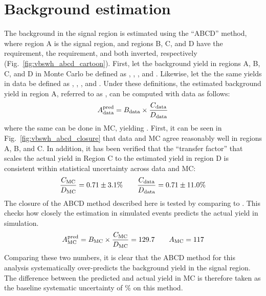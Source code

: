 \section{Background estimation}
The background in the signal region is estimated using the ``ABCD'' method, where region A is the signal region, and regions B, C, and D have the \detajj requirement, the \MSD requirement, and both inverted, respectively (Fig.~\ref{fig:vbswh_abcd_cartoon}). 
First, let the background yield in regions A, B, C, and D in Monte Carlo be defined as \AMC, \BMC, \CMC, and \DMC.
Likewise, let the the same yields in data be defined as  \Adata, \Bdata, \Cdata, and \Ddata.
Under these definitions, the estimated background yield in region A, referred to as \AdataPred, can be computed with data as follows:
\begin{equation}\label{eq:vbswh_abcd}
    A_{\text{data}}^{\text{pred}} = B_{\text{data}}\times\frac{C_{\text{data}}}{D_{\text{data}}}
\end{equation}
\noindent where the same can be done in MC, yielding \AMCPred. 
First, it can be seen in Fig.~\ref{fig:vbswh_abcd_closure} that data and MC agree reasonably well in regions A, B, and C. 
In addition, it has been verified that the ``transfer factor'' that scales the actual yield in Region C to the estimated yield in region D is consistent within statistical uncertainty across data and MC:
\begin{equation*}
    \frac{C_{\mathrm{MC}}}{D_{\mathrm{MC}}} = 0.71 \pm 3.1\% \qquad \frac{C_{\text{data}}}{D_{\text{data}}} = 0.71 \pm 11.0\%
\end{equation*}
The closure of the ABCD method described here is tested by comparing \AMCPred to \AMC. 
This checks how closely the estimation in simulated events predicts the actual yield in simulation. 
\begin{equation*}
    A_{\mathrm{MC}}^{\text{pred}} = B_{\mathrm{MC}}\times\frac{C_{\mathrm{MC}}}{D_{\mathrm{MC}}} = 129.7 \qquad A_{\mathrm{MC}} = 117
\end{equation*}
Comparing these two numbers, it is clear that the ABCD method for this analysis systematically over-predicts the background yield in the signal region. 
The difference between the predicted and actual yield in MC is therefore taken as the baseline systematic uncertainty of \BkgEstMethodSystErr\% on this method. 
